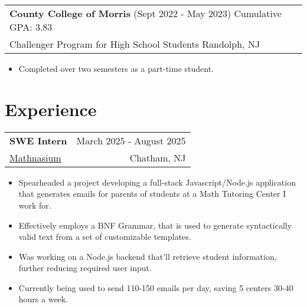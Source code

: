 \documentclass{article}
\begin{document}
    \vspace{-15pt}\begin{center}
        \begin{tabular}{p{}}
            {\large \bf County College of Morris} (Sept 2022 - May 2023) \hfill Cumulative GPA: 3.83 \\
            Challenger Program for High School Students \hfill Randolph, NJ
        \end{tabular}
    \end{center}
    \vspace{-10pt}\begin{itemize}
        \item Completed over two semesters as a part-time student.
    \end{itemize}

\section{Experience} \vspace{4pt}
    \raggedright\begin{tabular}{lr}
        \parbox[l]{3.65in}{\bf{\large{SWE Intern}}} &
        \parbox[r]{3.65in}{\raggedleft March 2025 - August 2025} \\
        \parbox[l]{3.65in}{\href{https://www.mathnasium.com/math-centers/chatham}{\underline{Mathnasium}}} &
        \parbox[r]{3.65in}{\raggedleft Chatham, NJ}
    \end{tabular}
    \vspace{-10pt}\begin{itemize} 
        \setlength{\itemsep}{-2pt}
        \item Spearheaded a project developing a full-stack Javascript/Node.js application that generates emails for parents of students at a Math Tutoring Center I work for.
        \item Effectively employs a BNF Grammar, that is used to generate syntactically valid text from a set of customizable templates.
        \item Was working on a Node.js backend that'll retrieve student information, further reducing required user input.
        \item Currently being used to send 110-150 emails per day, saving 5 centers 30-40 hours a week.
    \end{itemize}
\end{document}
